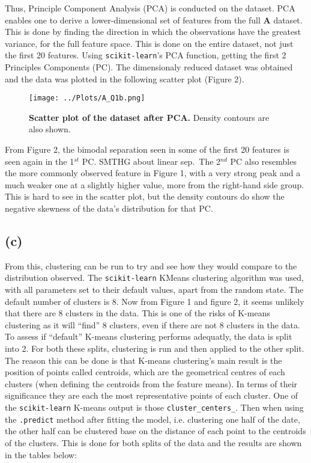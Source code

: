 \documentclass[12pt]{report} %
\begin{document}
Thus, Principle Component Analysis (PCA) is conducted on the dataset. PCA enables one to derive a lower-dimensional set of features from the full \textbf{A} dataset. This is done by finding the direction in which the observations have the greatest variance, for the full feature space\cite[pp. 255-257]{james2013introduction}. This is done on the entire dataset, not just the first 20 features. Using \texttt{scikit-learn}'s PCA function, getting the first 2 Principles Components (PC). The dimensionaly reduced dataset was obtained and the data was plotted in the following scatter plot (Figure 2).

\begin{figure}[h]
    \centering
    \texttt{[image: ../Plots/A\_Q1b.png]}
    \caption{\textbf{Scatter plot of the dataset after PCA.} Density contours are also shown.}
\end{figure}

From Figure 2, the bimodal separation seen in some of the first 20 features is seen again in the 1$^{st}$ PC. SMTHG about linear sep.\ The 2$^{nd}$ PC also resembles the more commonly observed feature in Figure 1, with a very strong peak and a much weaker one at a slightly higher value, more from the right-hand side group. This is hard to see in the scatter plot, but the density contours do show the negative skewness of the data's distribution for that PC.\

\subsection*{(c)}

From this, clustering can be run to try and see how they would compare to the distribution observed. The \texttt{scikit-learn} KMeans clustering algorithm was used, with all parameters set to their default values, apart from the random state.
The default number of clusters is 8. Now from Figure 1 and figure 2, it seems unlikely that there are 8 clusters in the data. This is one of the risks of K-means clustering as it will ``find'' 8 clusters, even if there are not 8 clusters in the data. To assess if ``default'' K-means clustering performs adequatly, the data is split into 2. For both these splits, clustering is run and then applied to the other split.  
The reason this can be done is that K-means clustering's main result is the position of points called centroids, which are the geometrical centres of each clusters (when defining the centroids from the feature means). In terms of their significance they are each the most representative points of each cluster. One of the \texttt{scikit-learn} K-means output is those \texttt{cluster\_centers\_}. Then when using the \texttt{.predict{}} method after fitting the model, i.e. clustering one half of the date, the other half can be clustered base on the distance of each point to the centroids of the clusters. This is done for both splits of the data and the results are shown in the tables below:
\end{document}
